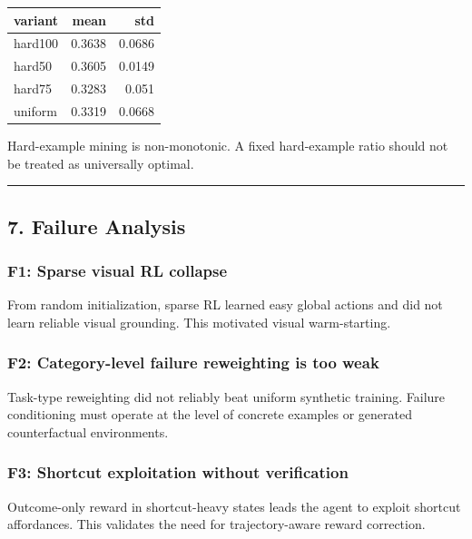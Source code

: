 \documentclass[
]{article}
\begin{document}
\begin{longtable}[]{@{}lrr@{}}
\toprule\noalign{}
variant & mean & std \\
\midrule\noalign{}
\endhead
\bottomrule\noalign{}
\endlastfoot
hard100 & 0.3638 & 0.0686 \\
hard50 & 0.3605 & 0.0149 \\
hard75 & 0.3283 & 0.051 \\
uniform & 0.3319 & 0.0668 \\
\end{longtable}

Hard-example mining is non-monotonic. A fixed hard-example ratio should
not be treated as universally optimal.

\begin{center}\rule{0.5\linewidth}{0.5pt}\end{center}

\subsection{7. Failure Analysis}\label{failure-analysis}

\subsubsection{F1: Sparse visual RL
collapse}\label{f1-sparse-visual-rl-collapse}

From random initialization, sparse RL learned easy global actions and
did not learn reliable visual grounding. This motivated visual
warm-starting.

\subsubsection{F2: Category-level failure reweighting is too
weak}\label{f2-category-level-failure-reweighting-is-too-weak}

Task-type reweighting did not reliably beat uniform synthetic training.
Failure conditioning must operate at the level of concrete examples or
generated counterfactual environments.

\subsubsection{F3: Shortcut exploitation without
verification}\label{f3-shortcut-exploitation-without-verification}

Outcome-only reward in shortcut-heavy states leads the agent to exploit
shortcut affordances. This validates the need for trajectory-aware
reward correction.
\end{document}
